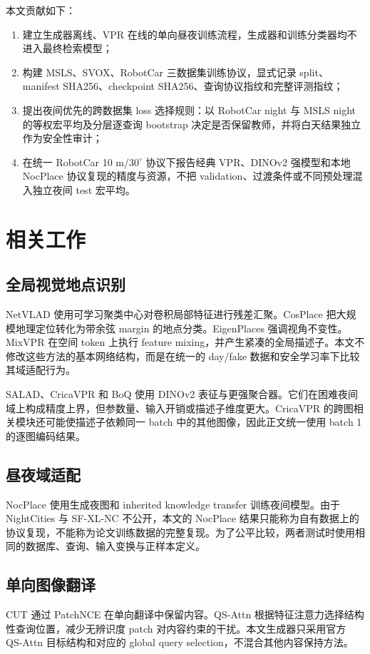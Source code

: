 \documentclass[UTF8,a4paper,11pt]{ctexart}
\begin{document}
本文贡献如下：
\begin{enumerate}
  \item 建立生成器离线、VPR 在线的单向昼夜训练流程，生成器和训练分类器均不进入最终检索模型；
  \item 构建 MSLS、SVOX、RobotCar 三数据集训练协议，显式记录 split、manifest SHA256、checkpoint SHA256、查询协议指纹和完整评测指纹；
  \item 提出夜间优先的跨数据集 loss 选择规则：以 RobotCar night 与 MSLS night 的等权宏平均及分层逐查询 bootstrap 决定是否保留教师，并将白天结果独立作为安全性审计；
  \item 在统一 RobotCar 10 m/$30^\circ$ 协议下报告经典 VPR、DINOv2 强模型和本地 NocPlace 协议复现的精度与资源，不把 validation、过渡条件或不同预处理混入独立夜间 test 宏平均。
\end{enumerate}

\section{相关工作}
\subsection{全局视觉地点识别}
NetVLAD\cite{netvlad} 使用可学习聚类中心对卷积局部特征进行残差汇聚。CosPlace\cite{bertoncosplace} 把大规模地理定位转化为带余弦 margin 的地点分类。EigenPlaces\cite{eigenplaces} 强调视角不变性。MixVPR\cite{mixvpr} 在空间 token 上执行 feature mixing，并产生紧凑的全局描述子。本文不修改这些方法的基本网络结构，而是在统一的 day/fake 数据和安全学习率下比较其域适配行为。

SALAD\cite{salad}、CricaVPR\cite{cricavpr} 和 BoQ\cite{boq} 使用 DINOv2 表征与更强聚合器。它们在困难夜间域上构成精度上界，但参数量、输入开销或描述子维度更大。CricaVPR 的跨图相关模块还可能使描述子依赖同一 batch 中的其他图像，因此正文统一使用 batch 1 的逐图编码结果。

\subsection{昼夜域适配}
NocPlace\cite{liu2024nocplace} 使用生成夜图和 inherited knowledge transfer 训练夜间模型。由于 NightCities 与 SF-XL-NC 不公开，本文的 NocPlace 结果只能称为自有数据上的协议复现，不能称为论文训练数据的完整复现。为了公平比较，两者测试时使用相同的数据库、查询、输入变换与正样本定义。

\subsection{单向图像翻译}
CUT\cite{cut} 通过 PatchNCE 在单向翻译中保留内容。QS-Attn\cite{qsattn} 根据特征注意力选择结构性查询位置，减少无辨识度 patch 对内容约束的干扰。本文生成器只采用官方 QS-Attn 目标结构和对应的 global query selection，不混合其他内容保持方法。
\end{document}
